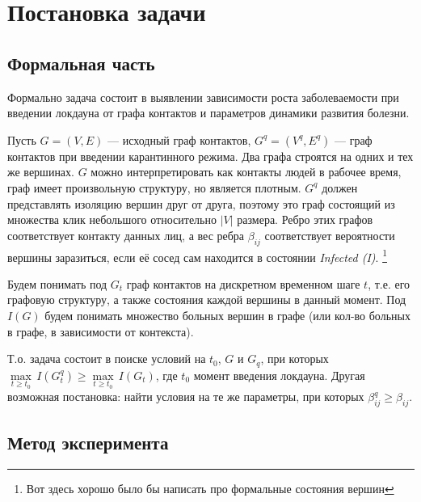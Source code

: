 	\section*{Постановка задачи}
	
	\subsection*{Формальная часть}
	
	Формально задача состоит в выявлении зависимости роста заболеваемости при введении локдауна от графа контактов и параметров динамики развития болезни.
	
	Пусть $ G = (V, E) $ --- исходный граф контактов, $ G^q = (V^q, E^q) $ --- граф контактов при введении карантинного режима. Два графа строятся на одних и тех же вершинах. $ G $ можно интерпретировать как контакты людей в рабочее время, граф имеет произвольную структуру, но является плотным. $G^q$ должен представлять изоляцию вершин друг от друга, поэтому это граф состоящий из множества клик небольшого относительно $\lvert V \rvert$ размера. Ребро этих графов соответствует контакту данных лиц, а вес ребра $ \beta_{ij} $ соответствует вероятности вершины заразиться, если её сосед сам находится в состоянии \textit{Infected (I)}. \footnote{Вот здесь хорошо было бы написать про формальные состояния вершин}
	
	Будем понимать под $ G_t $ граф контактов на дискретном временном шаге $ t $, т.е. его графовую структуру, а также состояния каждой вершины в данный момент. Под $ I(G) $ будем понимать множество больных вершин в графе (или кол-во больных в графе, в зависимости от контекста). 
	
	Т.о. задача состоит в поиске условий на $ t_0 $, $ G $ и $ G_q $, при которых $ \underset{t \ge t_0}{\max} \, I(G^q_t) \ge \underset{t \ge t_0}{\max} \, I(G_t) $, где $ t_0 $ момент введения локдауна. Другая возможная постановка: найти условия на те же параметры, при которых $ \beta_{ij}^q \ge \beta_{ij} $.
	
	\subsection*{Метод эксперимента}
	
